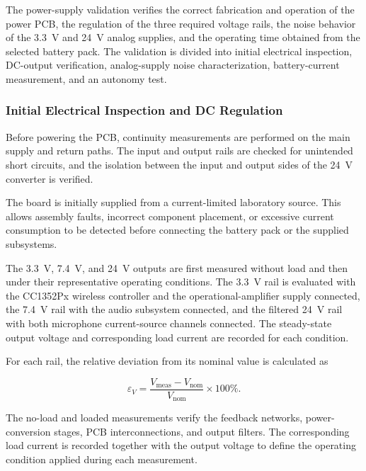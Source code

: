 The power-supply validation verifies the correct fabrication and operation of the power PCB, the regulation of the three required voltage rails, the noise behavior of the 3.3~V and 24~V analog supplies, and the operating time obtained from the selected battery pack. The validation is divided into initial electrical inspection, DC-output verification, analog-supply noise characterization, battery-current measurement, and an autonomy test.

\subsubsection{Initial Electrical Inspection and DC Regulation}

Before powering the PCB, continuity measurements are performed on the main supply and return paths. The input and output rails are checked for unintended short circuits, and the isolation between the input and output sides of the 24~V converter is verified.

The board is initially supplied from a current-limited laboratory source. This allows assembly faults, incorrect component placement, or excessive current consumption to be detected before connecting the battery pack or the supplied subsystems.

The 3.3~V, 7.4~V, and 24~V outputs are first measured without load and then under their representative operating conditions. The 3.3~V rail is evaluated with the CC1352Px wireless controller and the operational-amplifier supply connected, the 7.4~V rail with the audio subsystem connected, and the filtered 24~V rail with both microphone current-source channels connected. The steady-state output voltage and corresponding load current are recorded for each condition.

For each rail, the relative deviation from its nominal value is calculated as

\begin{equation}
    \varepsilon_V
    =
    \frac{
        V_{\mathrm{meas}}-V_{\mathrm{nom}}
    }{
        V_{\mathrm{nom}}
    }
    \times 100\%.
    \label{eq:rail_voltage_error}
\end{equation}

The no-load and loaded measurements verify the feedback networks, power-conversion stages, PCB interconnections, and output filters. The corresponding load current is recorded together with the output voltage to define the operating condition applied during each measurement.

